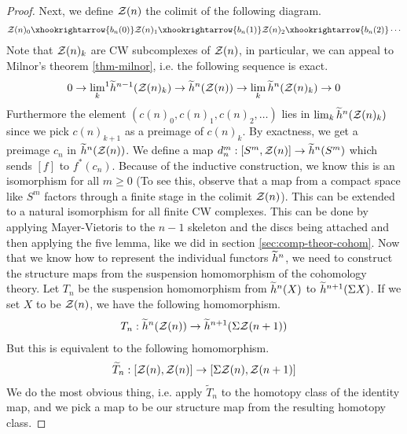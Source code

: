 \begin{proof}
  Next, we define $\mathcal{Z}(n)$ the colimit of the following diagram.
  \begin{align*}
    \calz(n)_0 \xhookrightarrow{b_n(0)} \calz(n)_1 \xhookrightarrow{b_n(1)} \calz(n)_2 \xhookrightarrow{b_n(2)} \cdots
  \end{align*}
  Note that $\mathcal{Z}(n)_k$ are CW subcomplexes of $\mathcal{Z}(n)$, in particular, we can appeal to Milnor's
  theorem \ref{thm-milnor}, i.e. the following sequence is exact.
  \begin{align*}
    0 \rightarrow {\lim_{k}}^1 \widetilde{h}^{n-1} (\mathcal{Z}(n)_k) \rightarrow \widetilde{h}^{n} (\mathcal{Z}(n)) \rightarrow \lim_{k} \widetilde{h}^{n} (\mathcal{Z}(n)_k) \rightarrow 0
  \end{align*}
  Furthermore the element $(c(n)_0, c(n)_1, c(n)_2, \ldots)$ lies in
  $\lim_{k} \widetilde{h}^{n} (\mathcal{Z}(n)_k)$ since we pick $c(n)_{k+1}$ as a preimage of $c(n)_k$. By
  exactness, we get a preimage $c_n$ in $\widetilde{h}^{n} (\mathcal{Z}(n))$. We define a map
  $d_n^m: [S^m, \mathcal{Z}(n)] \to \widetilde{h}^{n}(S^m)$ which sends $[f]$ to $f^{\ast}(c_n)$. Because of the
  inductive construction, we know this is an isomorphism for all $m \geq 0$ (To see this, observe
  that a map from a compact space like $S^m$ factors through a finite stage in the colimit
  $\mathcal{Z}(n)$). This can be extended to a natural isomorphism for all finite CW complexes.  This can
  be done by applying Mayer-Vietoris to the $n-1$ skeleton and the discs being attached and then
  applying the five lemma, like we did in section \ref{sec:comp-theor-cohom}.  Now that we know how
  to represent the individual functors $\widetilde{h}^{n}$, we need to construct the structure maps from
  the suspension homomorphism of the cohomology theory. Let $T_n$ be the suspension homomorphism
  from $\widetilde{h}^n(X)$ to $\widetilde{h}^{n+1}(\Sigma X)$. If we set $X$ to be $\mathcal{Z}(n)$, we have the
  following homomorphism.
  \begin{align*}
    T_n: \widetilde{h}^n(\mathcal{Z}(n)) \to \widetilde{h}^{n+1}(\Sigma \mathcal{Z}(n+1))
  \end{align*}
  But this is equivalent to the following homomorphism.
  \begin{align*}
    \widetilde{T}_n: [\mathcal{Z}(n), \mathcal{Z}(n)] \to [\Sigma \mathcal{Z}(n), \mathcal{Z}(n+1)]
  \end{align*}
  We do the most obvious thing, i.e. apply $\widetilde{T}_n$ to the homotopy class of the identity
  map, and we pick a map to be our structure map from the resulting homotopy class.

\end{proof}

